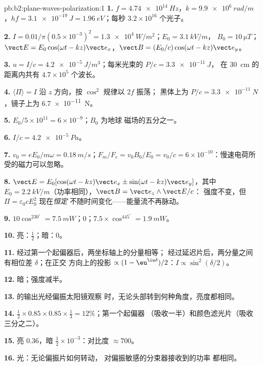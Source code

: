 \begin{solution}{pb:b2:plane-waves-polarization:1}
\textbf{1.} $f = \qty{4.74e14}{Hz}$，$k = \qty{9.9e6}{rad/m}$，$hf = \qty{3.1e-19}{J} =
\qty{1.96}{eV}$；每秒 $3.2 \times 10^{16}$ 个光子。

\textbf{2.} $I = 0.01/\pi(0.5 \times 10^{-3})^2 = \qty{1.3e4}{W/m^2}$；$E_0 = \qty{3.1}{kV/m}$，
$B_0 = \qty{10}{\micro T}$；$\vect E = E_0\cos(\omega t - kz)\vect e_x$，$\vect B = (E_0/c)\cos(\omega t
- kz)\vect e_y$。

\textbf{3.} $u = I/c = \qty{4.2e-5}{J/m^3}$；每米光束的 $P/c = \qty{3.3e-11}{J}$，
在 \qty{30}{cm} 的距离内共有 $4.7 \times 10^5$ 个波长。

\textbf{4.} $\langle\Pi\rangle = I$ 沿 $z$ 方向，按 $\cos^2$ 规律以 $2f$ 振荡；
黑体上为 $P/c = \qty{3.3e-11}{N}$，镜子上为 \qty{6.7e-11}{N}。

\textbf{5.} $E_0/5 \times 10^{11} = 6 \times 10^{-9}$；$B_0$ 为地球
磁场的五分之一。

\textbf{6.} $I/c = \qty{4.2e-5}{Pa}$。

\textbf{7.} $v_0 = eE_0/m\omega = \qty{0.18}{m/s}$；$F_m/F_e = v_0B_0/E_0 = v_0/c = 6 \times
10^{-10}$：慢速电荷所受的磁力可以忽略。

\textbf{8.} $\vect E = E_0[\cos(\omega t - kz)\vect e_x \pm \sin(\omega t - kz)\vect e_y]$，其中
$E_0 = \qty{2.2}{kV/m}$（功率相同），$\vect B = \vect e_z\wedge\vect E/c$：
强度不变，但 $\Pi = \varepsilon_0cE_0^2$ 现在\emph{恒定}
不随时间变化——能量流不再脉动。

\textbf{9.} $10\cos^230^\circ = \qty{7.5}{mW}$；$0$；$7.5 \times \cos^445^\circ = \qty{1.9}{mW}$。

\textbf{10.} 亮：$\tfrac12$；暗：$0$。

\textbf{11.} 经过第一个起偏器后，两坐标轴上的分量相等；
经过延迟片后，两分量之间有相位差 $\delta$；在正交
方向上的投影 $\propto(1 - \eu^{\iu\delta})/2$：$I \propto \sin^2(\delta/2)$。

\textbf{12.} 暗；强度减半。

\textbf{13.} 的输出光经偏振太阳镜观察
时，无论头部转到何种角度，亮度都相同。

\textbf{14.} $\tfrac12 \times 0.85 \times 0.85 \times \tfrac13 = 12\%$；第一个起偏器
（吸收一半）和颜色滤光片（吸收三分之二）。

\textbf{15.} 亮 $0.36$，暗 $\tfrac12 \times 10^{-3}$：对比度 $\approx 700$。

\textbf{16.} 光：无论偏振片如何转动，
对偏振敏感的分束器接收到的功率
都相同。


\end{solution}
